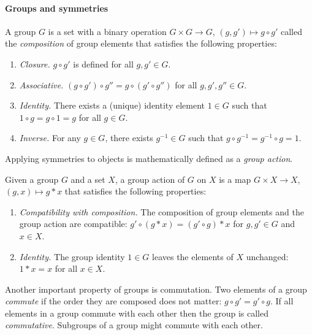 \paragraph{Groups and symmetries}
\begin{definition}[Group]
	A group $G$ is a set with a binary operation $G \times G \to G$, $(g, g') \mapsto g \circ g'$ called the \textit{composition} of group elements that satisfies the following properties:
	\begin{enumerate}
		\item \textit{Closure.}
		      $g \circ g'$ is defined for all $g, g' \in G$.
		\item \textit{Associative.}
		      $(g \circ g') \circ g'' = g \circ (g' \circ g'')$ for all $g, g', g'' \in G$.
		\item \textit{Identity.}
		      There exists a (unique) identity element $1 \in G$ such that $1 \circ g = g \circ 1 = g$ for all $g \in G$.
		\item \textit{Inverse.}
		      For any $g \in G$, there exists $g^{-1} \in G$ such that $g \circ g^{-1} = g^{-1} \circ g = 1$.
	\end{enumerate}
\end{definition}

Applying symmetries to objects is mathematically defined as a \textit{group action}.

\begin{definition}
	Given a group $G$ and a set $X$, a group action of $G$ on $X$ is a map $G \times X \to X$, $(g,x) \mapsto g * x$ that satisfies the following properties:
	\begin{enumerate}
		\item \textit{Compatibility with composition.}
		      The composition of group elements and the group action are compatible: $g' \circ (g * x) = (g' \circ g) * x$ for $g,g' \in G$ and $x \in X$.
		\item \textit{Identity.}
		      The group identity $1 \in G$ leaves the elements of $X$ unchanged: $1 * x = x$ for all $x \in X$.
	\end{enumerate}
\end{definition}

Another important property of groups is commutation.
Two elements of a group \textit{commute} if the order they are composed does not matter: $g \circ g' = g' \circ g$.
If all elements in a group commute with each other then the group is called \textit{commutative}.
Subgroups of a group might commute with each other.


